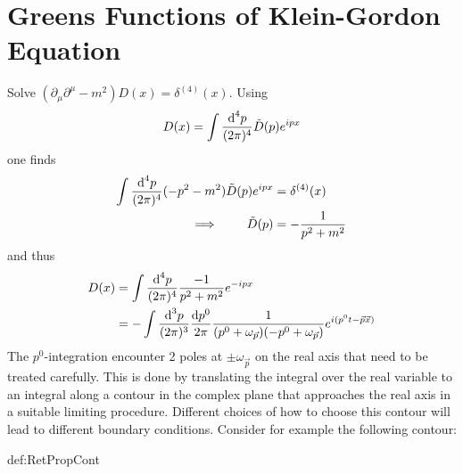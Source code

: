 \section{Greens Functions of Klein-Gordon Equation}
\label{sec:Apdx_GreensFunctionsKG}
Solve $(\partial_\mu\partial^\mu-m^2)D(x)=\delta^{(4)}(x)$. Using $$D(x)=\int\frac{\text{d}^4p}{(2\pi)^4}\tilde{D}(p)e^{{i} px}$$ one finds
\begin{subequations}
    \begin{align}
        \int\frac{\text{d}^4p}{(2\pi)^4}(-p^2-m^2)\tilde{D}(p)e^{{i} px}&=\delta^{(4)}(x)\\
        \implies\qquad\tilde{D}(p)&=-\frac{1}{p^2+m^2}
    \end{align}
\end{subequations}
    and thus
    \begin{subequations}
        \begin{align}
            D(x)&=\int\frac{\text{d}^4p}{(2\pi)^4}\frac{-1}{p^2+m^2}e^{-{i} px}\\
            &=-\int\frac{\text{d}^3p}{(2\pi)^3}\frac{\text{d} p^0}{2\pi}\frac{1}{(p^0+\omega_{\vec{p}})(-p^0+\omega_{\vec{p}})}e^{{i}(p^0t-\vec{p}\vec{x})}
        \end{align}
    \end{subequations}
    The $p^0$-integration encounter 2 poles at ${\pm\omega_{\vec{p}}}$ on the real axis that need to be treated carefully. This is done by translating the integral over the real variable to an integral along a contour in the complex plane that approaches the real axis in a suitable limiting procedure. Different choices of how to choose this contour will lead to different boundary conditions. Consider for example the following contour:
\begin{defin}{def:RetPropCont}
        \centering
\end{defin}

